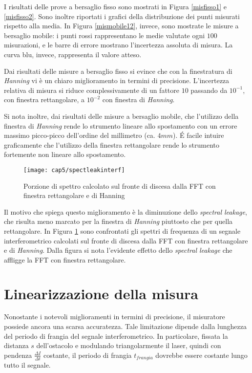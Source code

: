 I risultati delle prove a bersaglio fisso sono mostrati in Figura \ref{misfisso1} e \ref{misfisso2}. Sono inoltre riportati i grafici della distribuzione dei punti misurati rispetto alla media. In Figura \ref{mismobile12}, invece, sono mostrate le misure a bersaglio mobile: i punti rossi rappresentano le medie valutate ogni $100$ misurazioni, e le barre di errore mostrano l'incertezza assoluta di misura. La curva blu, invece, rappresenta il valore atteso.

Dai risultati delle misure a bersaglio fisso si evince che con la finestratura di \textit{Hanning} vi è un chiaro miglioramento in termini di precisione. L'incertezza relativa di misura si riduce complessivamente di un fattore $10$ passando da $10^{-1}$, con finestra rettangolare, a $10^{-2}$ con finestra di \textit{Hanning}.

Si nota inoltre, dai risultati delle misure a bersaglio mobile, che l'utilizzo della finestra di \textit{Hanning} rende lo strumento lineare allo spostamento con un errore massimo picco-picco dell'ordine del millimetro (ca. $4mm$). \'E facile intuire graficamente che l'utilizzo della finestra rettangolare rende lo strumento fortemente non lineare allo spostamento.
\begin{figure}  
  \begin{center}
    \texttt{[image: cap5/spectleakinterf]}
    \caption{Porzione di spettro calcolato sul fronte di discesa dalla FFT con finestra rettangolare e di Hanning}
    \label{spectleakinterf}
  \end{center}
\end{figure}

Il motivo che spiega questo miglioramento è la diminuzione dello \textit{spectral leakage}, che risulta meno marcato per la finestra di \textit{Hanning} piuttosto che per quella rettangolare. In Figura \ref{spectleakinterf} sono confrontati gli spettri di frequenza di un segnale interferometrico calcolati sul fronte di discesa dalla FFT con finestra rettangolare e di \textit{Hanning}. Dalla figura si nota l'evidente effetto dello \textit{spectral leakage} che affligge la FFT con finestra rettangolare.

\section{Linearizzazione della misura}
Nonostante i notevoli miglioramenti in termini di precisione, il misuratore possiede ancora una scarsa accuratezza. Tale limitazione dipende dalla lunghezza del periodo di frangia del segnale interferometrico. In particolare, fissata la distanza $s$ dell'ostacolo e modulando triangolarmente il laser, quindi con pendenza $\frac{\Delta I}{\Delta t}$ costante, il periodo di frangia $t_{frangia}$ dovrebbe essere costante lungo tutto il segnale. 

